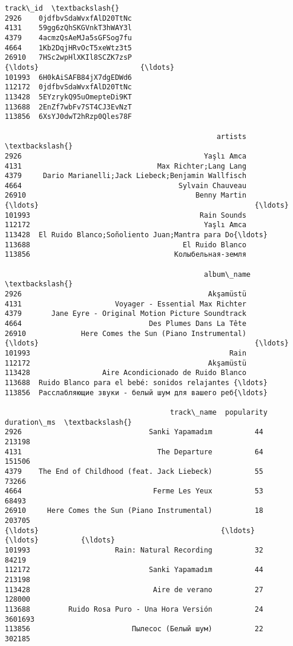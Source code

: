 \documentclass[11pt]{article}
\makeatletter
\newcommand{\boxspacing}{\kern\kvtcb@left@rule\kern\kvtcb@boxsep}
\newcommand{\prompt}[4]{
        {\ttfamily\llap{{\color{#2}[#3]:\hspace{3pt}#4}}\vspace{-\baselineskip}}
    }
\makeatother
\begin{document}
            \begin{tcolorbox}[breakable, size=fbox, boxrule=.5pt, pad at break*=1mm, opacityfill=0]
\prompt{Out}{outcolor}{62}{\boxspacing}
\begin{Verbatim}[commandchars=\\\{\}]
                      track\_id  \textbackslash{}
2926    0jdfbvSdaWvxfAlD20TtNc
4131    59gg6zQhSKGVnkT3hWAY3l
4379    4acmzQsAeMJa5sGFSog7fu
4664    1Kb2DqjHRvOcT5xeWtz3t5
26910   7HSc2wpHlXKIl8SCZK7zsP
{\ldots}                        {\ldots}
101993  6H0kAiSAFB84jX7dgEDWd6
112172  0jdfbvSdaWvxfAlD20TtNc
113428  5EYzrykQ95uOmepteDi9KT
113688  2EnZf7wbFv7ST4CJ3EvNzT
113856  6XsYJ0dwT2hRzp0Qles78F

                                                  artists  \textbackslash{}
2926                                           Yaşlı Amca
4131                                Max Richter;Lang Lang
4379     Dario Marianelli;Jack Liebeck;Benjamin Wallfisch
4664                                     Sylvain Chauveau
26910                                        Benny Martin
{\ldots}                                                   {\ldots}
101993                                        Rain Sounds
112172                                         Yaşlı Amca
113428  El Ruido Blanco;Soñoliento Juan;Mantra para Do{\ldots}
113688                                    El Ruido Blanco
113856                                  Колыбельная-земля

                                               album\_name  \textbackslash{}
2926                                            Akşamüstü
4131                      Voyager - Essential Max Richter
4379       Jane Eyre - Original Motion Picture Soundtrack
4664                              Des Plumes Dans La Tête
26910             Here Comes the Sun (Piano Instrumental)
{\ldots}                                                   {\ldots}
101993                                               Rain
112172                                          Akşamüstü
113428                 Aire Acondicionado de Ruido Blanco
113688  Ruido Blanco para el bebé: sonidos relajantes {\ldots}
113856  Расслабляющие звуки - белый шум для вашего реб{\ldots}

                                       track\_name  popularity  duration\_ms  \textbackslash{}
2926                              Sanki Yapamadım          44       213198
4131                                The Departure          64       151506
4379    The End of Childhood (feat. Jack Liebeck)          55        73266
4664                               Ferme Les Yeux          53        68493
26910     Here Comes the Sun (Piano Instrumental)          18       203705
{\ldots}                                           {\ldots}         {\ldots}          {\ldots}
101993                    Rain: Natural Recording          32        84219
112172                            Sanki Yapamadım          44       213198
113428                             Aire de verano          27       128000
113688         Ruido Rosa Puro - Una Hora Versión          24      3601693
113856                        Пылесос (Белый шум)          22       302185


\end{Verbatim}
\end{tcolorbox}
\end{document}
